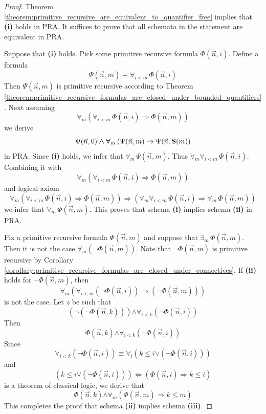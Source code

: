 \documentclass[10pt]{amsart}
\newcommand{\mforall}{\boldsymbol{\forall}}
\newcommand{\mexists}{\boldsymbol{\exists}}
\newcommand{\mra}{\boldsymbol{\Rightarrow}}
\newcommand{\mequiv}{\boldsymbol{\Leftrightarrow}}
\newcommand{\mand}{\boldsymbol{\wedge}}
\newcommand{\mor}{\boldsymbol{\vee}}
\newcommand{\mneg}{\boldsymbol{\neg}}
\newcommand{\mle}{\boldsymbol{<}}
\newcommand{\mleq}{\boldsymbol{\leq}}
\begin{document}
\begin{proof}
	Theorem \ref{theorem:primitive_recursive_are_equivalent_to_quantifier_free} implies that \textbf{(i)} holds in $\mathrm{PRA}$. It suffices to prove that all schemata in the statement are equivalent in $\mathrm{PRA}$.

	Suppose that \textbf{(i)} holds. Pick some primitive recursive formula $\Phi(\vec{n},i)$. Define a formula
	$$\Psi(\vec{n},m) \equiv \mforall_{i \mle m}\,\Phi(\vec{n},i)$$
	Then $\Psi(\vec{n},m)$ is primitive recursive according to Theorem \ref{theorem:primitive_recursive_formulas_are_closed_under_bounded_quantifiers}. Next assuming
	$$\mforall_m\left(\mforall_{i \mle m}\,\Phi(\vec{n},i) \mra \Phi(\vec{n},m)\right)$$
	we derive
	$$\Psi(\vec{n},0) \mand \mforall_m\left(\Psi(\vec{n},m)\ra \Psi(\vec{n},\bd{S}(m)\right)$$
	in $\mathrm{PRA}$. Since \textbf{(i)} holds, we infer that $\mforall_m\,\Psi(\vec{n},m)$. Thus $\mforall_m\mforall_{i \mle m}\,\Phi(\vec{n},i)$. Combining it with
	$$\mforall_m\left(\mforall_{i \mle m}\,\Phi(\vec{n},i) \mra \Phi(\vec{n},m)\right)$$
	and logical axiom
	$$\mforall_m\left(\mforall_{i \mle m}\,\Phi(\vec{n},i) \mra \Phi(\vec{n},m)\right) \mra \left(\mforall_m\mforall_{i \mle m}\,\Phi(\vec{n},i) \mra \mforall_m\,\Phi(\vec{n},m)\right)$$
	we infer that $\mforall_m\,\Phi(\vec{n},m)$. This proves that schema \textbf{(i)} implies schema \textbf{(ii)} in $\mathrm{PRA}$.

	Fix a primitive recursive formula $\Phi(\vec{n},m)$ and suppose that $\mexists_m\,\Phi(\vec{n},m)$. Then it is not the case $\mforall_m\left(\mneg \Phi(\vec{n},m)\right)$. Note that $\mneg \Phi(\vec{n},m)$ is primitive recursive by Corollary \ref{corollary:primitive_recursive_formulas_are_closed_under_connectives}. If \textbf{(ii)} holds for $\mneg \Phi(\vec{n},m)$, then
	$$\mforall_m\left(\mforall_{i \mle m}\left(\mneg \Phi(\vec{n},i)\right) \mra \left(\mneg \Phi(\vec{n},m)\right)\right)$$
	is not the case. Let $z$ be such that
	$$\left(\mneg \left(\mneg \Phi(\vec{n},k)\right)\right) \mand \mforall_{i \mle k}\left(\mneg \Phi(\vec{n},i)\right)$$
	Then
	$$\Phi(\vec{n},k) \mand \mforall_{i \mle k}\left(\mneg \Phi(\vec{n},i)\right)$$
	Since
	$$\mforall_{i \mle k}\left(\mneg \Phi(\vec{n},i)\right) \equiv \mforall_i\left(k \mleq i \mor \left(\mneg \Phi(\vec{n},i)\right)\right)$$
	and
	$$\left(k \mleq i \mor \left(\mneg \Phi(\vec{n},i)\right)\right) \mequiv \left(\Phi(\vec{n},i) \mra k \mleq i\right)$$
	is a theorem of classical logic, we derive that
	$$\Phi(\vec{n},k) \mand \mforall_m\left(\Phi(\vec{n},m) \mra k \mleq m\right)$$
	This completes the proof that schema \textbf{(ii)} implies schema \textbf{(iii)}.


\end{proof}
\end{document}
